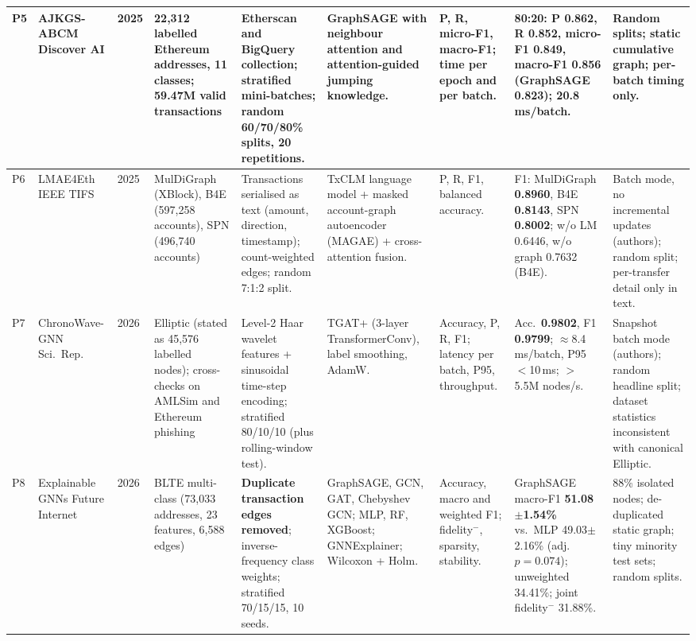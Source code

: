 \documentclass[11pt,a4paper]{article}
\begin{document}
\begin{landscape}
\begin{longtable}{L{0.55cm} L{2.3cm} L{0.8cm} L{2.6cm} L{2.9cm} L{3.0cm} L{2.1cm} L{3.2cm} L{3.6cm}}
\midrule
P5 & AJKGS-ABCM \cite{kasula2025ajk}\newline Discover AI & 2025 & 22,312 labelled Ethereum addresses, 11 classes; 59.47M valid transactions & Etherscan and BigQuery collection; stratified mini-batches; random 60/70/80\% splits, 20 repetitions. & GraphSAGE with neighbour attention and attention-guided jumping knowledge. & P, R, micro-F1, macro-F1; time per epoch and per batch. & 80:20: P 0.862, R 0.852, micro-F1 0.849, macro-F1 \textbf{0.856} (GraphSAGE 0.823); 20.8\,ms/batch. & Random splits; static cumulative graph; per-batch timing only. \\
\midrule
P6 & LMAE4Eth \cite{jia2025lmae4eth}\newline IEEE TIFS & 2025 & MulDiGraph (XBlock), B4E (597,258 accounts), SPN (496,740 accounts) & Transactions serialised as text (amount, direction, timestamp); count-weighted edges; random 7:1:2 split. & TxCLM language model + masked account-graph autoencoder (MAGAE) + cross-attention fusion. & P, R, F1, balanced accuracy. & F1: MulDiGraph \textbf{0.8960}, B4E \textbf{0.8143}, SPN \textbf{0.8002}; w/o LM 0.6446, w/o graph 0.7632 (B4E). & Batch mode, no incremental updates (authors); random split; per-transfer detail only in text. \\
\midrule
P7 & ChronoWave-GNN \cite{lin2026chronowave}\newline Sci.\ Rep. & 2026 & Elliptic (stated as 45,576 labelled nodes); cross-checks on AMLSim and Ethereum phishing & Level-2 Haar wavelet features + sinusoidal time-step encoding; stratified 80/10/10 (plus rolling-window test). & TGAT+ (3-layer TransformerConv), label smoothing, AdamW. & Accuracy, P, R, F1; latency per batch, P95, throughput. & Acc.\ \textbf{0.9802}, F1 \textbf{0.9799}; $\approx$8.4\,ms/batch, P95 $<$10\,ms; $>$5.5M nodes/s. & Snapshot batch mode (authors); random headline split; dataset statistics inconsistent with canonical Elliptic. \\
\midrule
P8 & Explainable GNNs \cite{alemari2026explainable}\newline Future Internet & 2026 & BLTE multi-class (73,033 addresses, 23 features, 6,588 edges) & \textbf{Duplicate transaction edges removed}; inverse-frequency class weights; stratified 70/15/15, 10 seeds. & GraphSAGE, GCN, GAT, Chebyshev GCN; MLP, RF, XGBoost; GNNExplainer; Wilcoxon + Holm. & Accuracy, macro and weighted F1; fidelity$^-$, sparsity, stability. & GraphSAGE macro-F1 \textbf{51.08$\pm$1.54\%} vs.\ MLP 49.03$\pm$2.16\% (adj.\ $p=0.074$); unweighted 34.41\%; joint fidelity$^-$ 31.88\%. & 88\% isolated nodes; de-duplicated static graph; tiny minority test sets; random splits. \\

\end{longtable}
\end{landscape}
\end{document}
